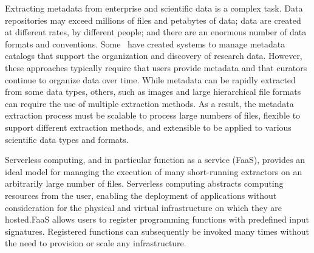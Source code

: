\documentclass[sigconf]{acmart}
\newcommand{\tyler}[1]{}
\newcommand{\tyler}[1]{{\textcolor{cyan}{ tyler: #1 }}}
\begin{document}

\tyler{Add note here about the edge}
Extracting metadata from enterprise and scientific data is a complex task. 
Data repositories may exceed millions of files and petabytes of data;
data are created at different rates, by different people; 
and there are an enormous number of data formats and conventions. 
Some~\cite{egan2003vizier, welter2013nhgri, irods, dataverse} have created 
systems to manage metadata catalogs that
support the organization and discovery of research data. However, these approaches typically 
require that users provide metadata and that curators continue to organize data over time.
While metadata can be rapidly extracted from some data types, others, such as
images and large hierarchical file formats can require the use of multiple extraction methods.  
As a result, the metadata extraction process must be scalable to process large numbers
of files, flexible to support different extraction methods, and extensible
to be applied to various scientific data types and formats.

Serverless computing, and in particular function as a service (FaaS),
provides an ideal model for managing the execution of
many short-running extractors on an arbitrarily large number of files. 
Serverless computing abstracts computing resources from the user, enabling
the deployment of applications without consideration for the physical and virtual infrastructure on which 
they are hosted.FaaS allows users to register programming functions with predefined input signatures. 
Registered functions can subsequently be invoked many times
without the need to provision or scale any infrastructure.
\end{document}

